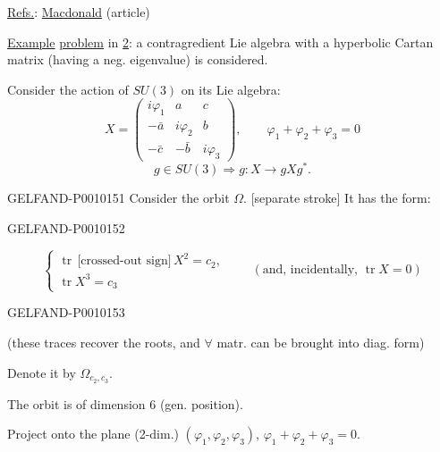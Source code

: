\underline{Refs.}: \underline{Macdonald} (article)

\underline{Example} \underline{problem} in \underline{2}: a contragredient Lie algebra with a hyperbolic Cartan matrix (having a neg. eigenvalue) is considered.

Consider the action of $SU(3)$ on its Lie algebra:
\[
X=\begin{pmatrix}
i\varphi_1&a&c\\
-\bar a&i\varphi_2&b\\
-\bar c&-\bar b&i\varphi_3
\end{pmatrix},\qquad
\varphi_1+\varphi_2+\varphi_3=0
\]
\[
g\in SU(3)\Rightarrow g:X\to gXg^*.
\]


\begin{GelfandAdjacentEvidence}{GELFAND-P001015}{1}
Consider the orbit $\Omega$. [separate stroke] It has the form:
\end{GelfandAdjacentEvidence}
\begin{GelfandAdjacentEvidence}{GELFAND-P001015}{2}

\[
\begin{cases}
\operatorname{tr}\,\text{[crossed-out sign]}\,X^2=c_2,\\
\operatorname{tr}X^3=c_3
\end{cases}
\qquad (\text{and, incidentally, }\operatorname{tr}X=0)
\]
\end{GelfandAdjacentEvidence}
\begin{GelfandAdjacentEvidence}{GELFAND-P001015}{3}

(these traces recover the roots, and $\forall$ matr. can be brought into diag. form)

Denote it by $\Omega_{c_2,c_3}$.

The orbit is of dimension 6 (gen. position).

Project onto the plane (2-dim.) $(\varphi_1,\varphi_2,\varphi_3)$,
$\varphi_1+\varphi_2+\varphi_3=0$.

\end{GelfandAdjacentEvidence}
